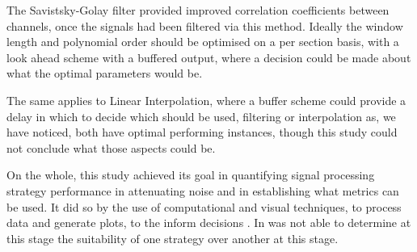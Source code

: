 The Savistsky-Golay filter provided improved correlation coefficients between channels, once the signals had been filtered via this method. Ideally the window length and polynomial order should be optimised on a per section basis, with a look ahead scheme with a buffered output, where a decision could be made about what the optimal parameters would be.

The same applies to Linear Interpolation, where a buffer scheme could provide a delay in which to decide which should be used, filtering or interpolation as, we have noticed, both have optimal performing instances, though this study could not conclude what those aspects could be.

On the whole, this study achieved its goal in quantifying signal processing strategy performance in attenuating noise and in establishing what metrics can be used. It did so by the use of computational and visual techniques, to process data and generate plots, to the inform decisions\cite{Sikar:INM433} . In was not able to determine at this stage the suitability of one strategy over another at this stage.